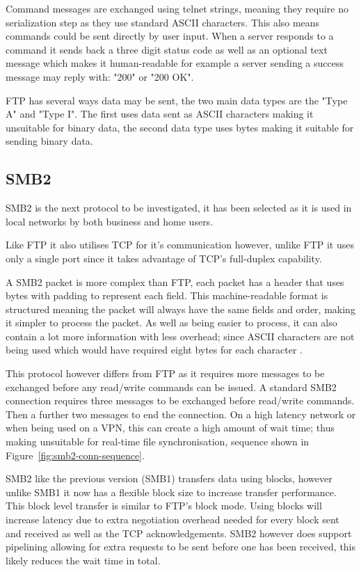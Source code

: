 Command messages are exchanged using telnet strings, meaning they require no serialization step as they use standard ASCII characters. This also means commands could be sent directly by user input. When a server responds to a command it sends back a three digit status code as well as an optional text message which makes it human-readable for example a server sending a success message may reply with: "200" or "200 OK".

FTP has several ways data may be sent, the two main data types are the "Type A" and "Type I". The first uses data sent as ASCII characters making it unsuitable for binary data, the second data type uses bytes making it suitable for sending binary data.

\subsection*{SMB2}
SMB2 is the next protocol to be investigated, it has been selected as it is used in local networks by both business and home users.

Like FTP it also utilises TCP for it's communication however, unlike FTP it uses only a single port since it takes advantage of TCP's full-duplex capability.

A SMB2 packet is more complex than FTP, each packet has a header that uses bytes with padding to represent each field. This machine-readable format is structured meaning the packet will always have the same fields and order, making it simpler to process the packet. As well as being easier to process, it can also contain a lot more information with less overhead; since ASCII characters are not being used which would have required eight bytes for each character \parencite{smb2}.

This protocol however differs from FTP as it requires more messages to be exchanged before any read/write commands can be issued. A standard SMB2 connection requires three messages to be exchanged before read/write commands. Then a further two messages to end the connection. On a high latency network or when being used on a VPN, this can create a high amount of wait time; thus making unsuitable for real-time file synchronisation, sequence shown in Figure~\ref{fig:smb2-conn-sequence}.

SMB2 like the previous version (SMB1) transfers data using blocks, however unlike SMB1 it now has a flexible block size to increase transfer performance. This block level transfer is similar to FTP's block mode. Using blocks will increase latency due to extra negotiation overhead needed for every block sent and received as well as the TCP acknowledgements. SMB2 however does support pipelining allowing for extra requests to be sent before one has been received, this likely reduces the wait time in total.

